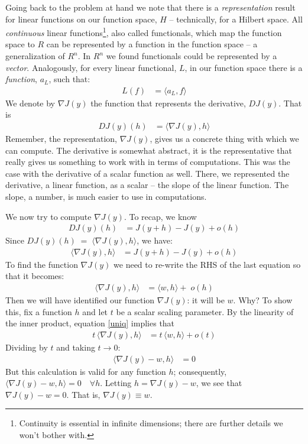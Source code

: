 \documentclass{article}
\begin{document}
Going back to the problem at hand we note that there is
a {\em representation\/} result for linear functions on our function space,
$H$ -- technically, for a Hilbert space.
All {\em continuous\/} linear functions\footnote{Continuity is essential in infinite dimensions; there are further details we won't bother with.}, also called
functionals, which map the function space to $R$
can be represented by a function in the function space
-- a generalization of $R^n$. In $R^n$ we found functionals could be
represented by a {\em vector\/}. Analogously, for every linear functional, $L$,
in our function space there is a {\em function\/}, $a_L$, such that:
\begin{align}
L(f) &= \langle a_L, f \rangle
\end{align}
We denote by $\nabla J(y)$ the
function that represents the derivative, $DJ(y)$. That is
\begin{align}
  DJ(y)(h) &= \langle \nabla J(y), h \rangle
\end{align}
Remember, the
representation, $\nabla J(y)$, gives us a concrete thing with which we can compute.
The derivative is somewhat abstract, it is the representative that really
gives us something to work with in terms of computations. This was the case
with the derivative of a scalar function as well. There, we represented the derivative,
a linear function, as a scalar -- the slope of the linear function. The slope, a
number, is much easier to use in computations.

We now try to compute $\nabla J(y)$.
To recap, we know
\begin{align}
  DJ(y)(h) &= J(y+h) - J(y) + o(h)
\end{align}
Since $DJ(y)(h) \; = \; \langle \nabla J(y), h \rangle$, we have:
\begin{align}
  \langle \nabla J(y), h \rangle &= J(y+h) - J(y) + o(h) \label{grad_eq}
\end{align}
To find the function $\nabla J(y)$ we need to re-write the RHS of the last equation
so that it becomes:
\begin{align}
  \langle \nabla J(y), h \rangle &= \langle w, h \rangle + \; o(h) \label{uniq}
\end{align}
Then we will have identified our function $\nabla J(y)$: it will be $w$. Why?
To show this, fix a function $h$ and let $t$ be a scalar scaling parameter.
By the linearity of the inner product, equation \eqref{uniq} implies that
\begin{align}
  t \, \langle \nabla J(y), h \rangle &= t \, \langle w, h \rangle + o(t)
\end{align}
Dividing by $t$ and taking $t \rightarrow 0$:
\begin{align}
	\langle \nabla J(y) - w, h \rangle &= 0
\end{align}
But this calculation is valid for any function $h$; consequently,
$\langle \nabla J(y) - w, h \rangle = 0 \quad \forall h$.
Letting $h = \nabla J(y) - w$, we see that $\nabla J(y) - w = 0$.
That is, $\nabla J(y) \equiv w$.
\end{document}
